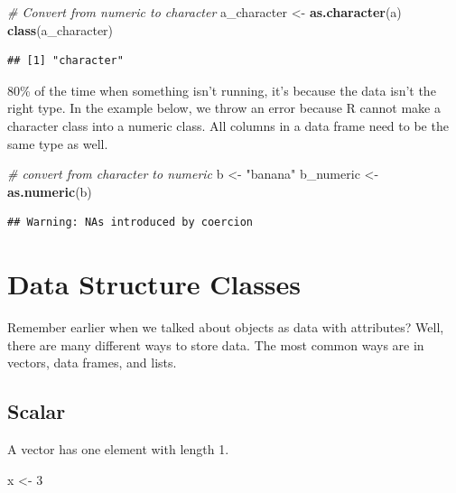 \documentclass[
]{book}
\newenvironment{Shaded}{\begin{snugshade}}{\end{snugshade}}
\newcommand{\CommentTok}[1]{\textcolor[rgb]{0.56,0.35,0.01}{\textit{#1}}}
\newcommand{\DecValTok}[1]{\textcolor[rgb]{0.00,0.00,0.81}{#1}}
\newcommand{\FunctionTok}[1]{\textcolor[rgb]{0.13,0.29,0.53}{\textbf{#1}}}
\newcommand{\NormalTok}[1]{#1}
\newcommand{\OtherTok}[1]{\textcolor[rgb]{0.56,0.35,0.01}{#1}}
\newcommand{\StringTok}[1]{\textcolor[rgb]{0.31,0.60,0.02}{#1}}
\begin{document}
\begin{Shaded}
\begin{Highlighting}[]
\CommentTok{\# Convert from numeric to character}
\NormalTok{a\_character }\OtherTok{\textless{}{-}} \FunctionTok{as.character}\NormalTok{(a)}
\FunctionTok{class}\NormalTok{(a\_character)}
\end{Highlighting}
\end{Shaded}

\begin{verbatim}
## [1] "character"
\end{verbatim}

80\% of the time when something isn't running, it's because the data isn't the right type. In the example below, we throw an error because R cannot make a character class into a numeric class. All columns in a data frame need to be the same type as well.

\begin{Shaded}
\begin{Highlighting}[]
\CommentTok{\# convert from character to numeric}
\NormalTok{b }\OtherTok{\textless{}{-}} \StringTok{"banana"}
\NormalTok{b\_numeric }\OtherTok{\textless{}{-}} \FunctionTok{as.numeric}\NormalTok{(b)}
\end{Highlighting}
\end{Shaded}

\begin{verbatim}
## Warning: NAs introduced by coercion
\end{verbatim}

\section{Data Structure Classes}\label{data-structure-classes}

Remember earlier when we talked about objects as data with attributes?
Well, there are many different ways to store data. The most common ways are in vectors, data frames, and lists.

\subsection{Scalar}\label{scalar}

A vector has one element with length 1.

\begin{Shaded}
\begin{Highlighting}[]
\NormalTok{x }\OtherTok{\textless{}{-}} \DecValTok{3}
\end{Highlighting}
\end{Shaded}
\end{document}
